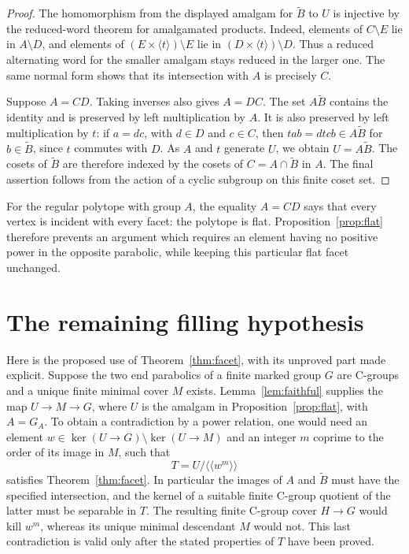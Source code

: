 \documentclass[11pt]{article}
\theoremstyle{remark}\newtheorem{remark}[theorem]{Remark}
\newcommand{\gen}[1]{\langle #1\rangle}
\newcommand{\ncl}[1]{\langle\!\langle #1\rangle\!\rangle}
\begin{document}
\begin{proof}
The homomorphism from the displayed amalgam for \(\widetilde B\) to \(U\)
is injective by the reduced-word theorem for amalgamated products. Indeed,
elements of \(C\setminus E\) lie in \(A\setminus D\), and elements of
\((E\times\gen t)\setminus E\) lie in
\((D\times\gen t)\setminus D\). Thus a reduced alternating word for the
smaller amalgam stays reduced in the larger one. The same normal form
shows that its intersection with \(A\) is precisely \(C\).

Suppose \(A=CD\). Taking inverses also gives \(A=DC\). The set
\(A\widetilde B\) contains the identity and is preserved by left
multiplication by \(A\). It is also preserved by left multiplication by
\(t\): if \(a=dc\), with \(d\in D\) and \(c\in C\), then
\(tab=dtcb\in A\widetilde B\) for \(b\in\widetilde B\), since \(t\)
commutes with \(D\). As \(A\) and \(t\) generate \(U\), we obtain
\(U=A\widetilde B\). The cosets of \(\widetilde B\) are therefore indexed
by the cosets of \(C=A\cap\widetilde B\) in \(A\). The final assertion
follows from the action of a cyclic subgroup on this finite coset set.
\end{proof}

For the regular polytope with group \(A\), the equality \(A=CD\) says
that every vertex is incident with every facet: the polytope is flat.
Proposition~\ref{prop:flat} therefore prevents an argument which requires
an element having no positive power in the opposite parabolic, while
keeping this particular flat facet unchanged.

\section{The remaining filling hypothesis}

Here is the proposed use of Theorem~\ref{thm:facet}, with its unproved
part made explicit. Suppose the two end parabolics of a finite marked
group \(G\) are C-groups and a unique finite minimal cover \(M\) exists.
Lemma~\ref{lem:faithful} supplies the map \(U\to M\to G\), where \(U\)
is the amalgam in Proposition~\ref{prop:flat}, with \(A=G_A\).
To obtain a contradiction by a power relation, one would need an element
\(w\in\ker(U\to G)\setminus\ker(U\to M)\) and an integer \(m\) coprime
to the order of its image in \(M\), such that
\[
 T=U/\ncl{w^m}
\]
satisfies Theorem~\ref{thm:facet}. In particular the images of \(A\) and
\(\widetilde B\) must have the specified intersection, and the kernel of
a suitable finite C-group quotient of the latter must be separable in
\(T\). The resulting finite C-group cover \(H\to G\) would kill
\(w^m\), whereas its unique minimal descendant \(M\) would not. This
last contradiction is valid only after the stated properties of \(T\)
have been proved.
\end{document}
